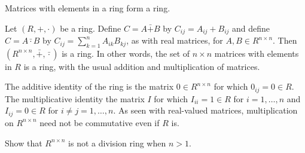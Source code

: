
Matrices with elements in a ring form a ring.

Let $(R, +, \cdot )$ be a ring.
Define $C = A \bar{+} B$ by $C_{ij} = A_{ij} + B_{ij}$ and define $C = A \bar{\cdot } B$ by $C_{ij} = \sum_{k = 1}^{n} A_{ik}B_{kj}$, as with real matrices, for $A, B \in R^{n \times n}$.
Then $(R^{n \times  n}, \bar{+}, \bar{\cdot })$ is a ring.
In other words, the set of $n \times  n$ matrices with elements in $R$ is a ring, with the usual addition and multiplication of matrices.

The additive identity of the ring is the matrix $0 \in R^{n \times  n}$ for which $0_{ij} = 0 \in R$.
The multiplicative identity the matrix $I$ for which $I_{ii} = 1 \in R$ for $i = 1, \dots , n$ and $I_{ij} = 0 \in R$ for $i \neq j = 1, \dots , n$.
As seen with real-valued matrices, multiplication on $R^{n \times  n}$ need not be commutative even if $R$ is.

\begin{exercise}
Show that $R^{n \times  n}$ is not a division ring when $n > 1$.
\end{exercise}

\blankpage
